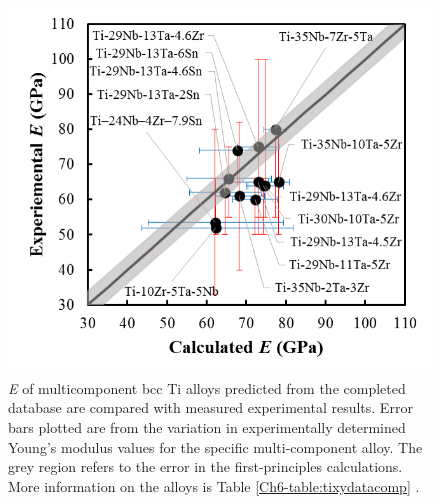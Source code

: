 \pagebreak
\begin{figure}[H]
	\centering
	\includegraphics[width=\textwidth]{Chapter-6/Figures/tixydatabase.png}
	\caption{\textit{E} of multicomponent bcc Ti alloys predicted from the completed database are compared with measured experimental results. Error bars plotted are from the variation in experimentally determined Young’s modulus values for the specific multi-component alloy. The grey region refers to the error in the first-principles calculations. More information on the alloys is Table \ref{Ch6-table:tixydatacomp} \cite{Mohammed2014,Geetha2009,Tane2010a}.}
	\label{Ch6-figure:tixydatabase}
\end{figure}
